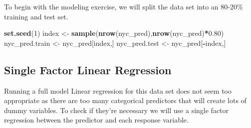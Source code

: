 \documentclass[
  a3paper,
]{article}
\newenvironment{Shaded}{\begin{snugshade}}{\end{snugshade}}
\newcommand{\CommentTok}[1]{\textcolor[rgb]{0.56,0.35,0.01}{\textit{#1}}}
\newcommand{\DataTypeTok}[1]{\textcolor[rgb]{0.13,0.29,0.53}{#1}}
\newcommand{\DecValTok}[1]{\textcolor[rgb]{0.00,0.00,0.81}{#1}}
\newcommand{\FloatTok}[1]{\textcolor[rgb]{0.00,0.00,0.81}{#1}}
\newcommand{\KeywordTok}[1]{\textcolor[rgb]{0.13,0.29,0.53}{\textbf{#1}}}
\newcommand{\NormalTok}[1]{#1}
\newcommand{\OperatorTok}[1]{\textcolor[rgb]{0.81,0.36,0.00}{\textbf{#1}}}
\newcommand{\StringTok}[1]{\textcolor[rgb]{0.31,0.60,0.02}{#1}}
\begin{document}
To begin with the modeling exercise, we will split the data set into an
80-20\% training and test set.

\begin{Shaded}
\begin{Highlighting}[]
\KeywordTok{set.seed}\NormalTok{(}\DecValTok{1}\NormalTok{)}
\NormalTok{index <-}\StringTok{ }\KeywordTok{sample}\NormalTok{(}\KeywordTok{nrow}\NormalTok{(nyc_pred),}\KeywordTok{nrow}\NormalTok{(nyc_pred)}\OperatorTok{*}\FloatTok{0.80}\NormalTok{)}
\NormalTok{nyc_pred.train <-}\StringTok{ }\NormalTok{nyc_pred[index,]}
\NormalTok{nyc_pred.test <-}\StringTok{ }\NormalTok{nyc_pred[}\OperatorTok{-}\NormalTok{index,]}
\end{Highlighting}
\end{Shaded}

\hypertarget{single-factor-linear-regression}{%
\subsection{\texorpdfstring{\textbf{Single Factor Linear
Regression}}{Single Factor Linear Regression}}\label{single-factor-linear-regression}}

Running a full model Linear regression for this data set does not seem
too appropriate as there are too many categorical predictors that will
create lots of dummy variables. To check if they're necessary we will
use a single factor regression between the predictor and each response
variable.

\begin{Shaded}
\end{Shaded}
\end{document}
